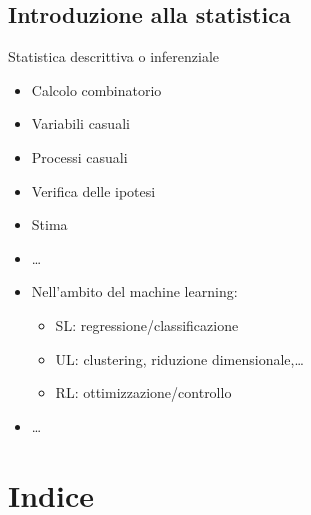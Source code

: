 \documentclass[letterpaper,10pt,italian]{jupyterBook}
\begin{document}
\chapter{Introduzione alla statistica}
\label{\detokenize{ch/statistics:introduzione-alla-statistica}}\label{\detokenize{ch/statistics:math-hs-statistics}}\label{\detokenize{ch/statistics::doc}}
\sphinxAtStartPar
{} Statistica descrittiva o inferenziale

\sphinxAtStartPar
{}
\begin{itemize}
\item {} 
\sphinxAtStartPar
Calcolo combinatorio

\item {} 
\sphinxAtStartPar
Variabili casuali

\item {} 
\sphinxAtStartPar
Processi casuali

\end{itemize}

\sphinxAtStartPar
{}
\begin{itemize}
\item {} 
\sphinxAtStartPar
Verifica delle ipotesi

\item {} 
\sphinxAtStartPar
Stima

\item {} 
\sphinxAtStartPar
…

\item {} 
\sphinxAtStartPar
Nell’ambito del machine learning:
\begin{itemize}
\item {} 
\sphinxAtStartPar
SL: regressione/classificazione

\item {} 
\sphinxAtStartPar
UL: clustering, riduzione dimensionale,…

\item {} 
\sphinxAtStartPar
RL: ottimizzazione/controllo

\end{itemize}

\item {} 
\sphinxAtStartPar
…

\end{itemize}

\sphinxstepscope


\part{Indice}
\end{document}
